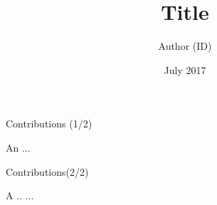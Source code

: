\documentclass[12pt,t]{beamer}
\begin{document}
\author{{Author} (ID)}
\title[Final Review]{Title} %

 

\date{July 2017}


\begin{frame}[plain]
    \titlepage
   
\end{frame}


\begin{frame}{Contributions (1/2)}


\lipsum[66]

\begin{block}{ An ...}
    \lipsum[75]
    
\end{block}


\end{frame}
\begin{frame}{Contributions(2/2)}
\begin{block}{ A ..}
...\lipsum[10]
\end{block}
\end{frame}
\end{document}
